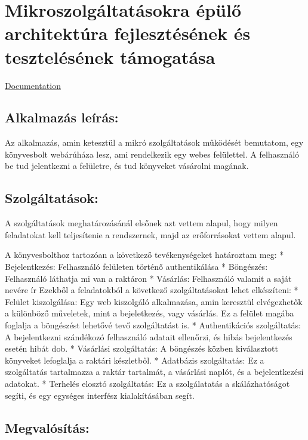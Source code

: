 \documentclass[]{article}
\date{}
\begin{document}
\section{Mikroszolgáltatásokra épülő architektúra fejlesztésének és
tesztelésének
támogatása}\label{mikroszolguxe1ltatuxe1sokra-uxe9puxfclux151-architektuxfara-fejlesztuxe9suxe9nek-uxe9s-teszteluxe9suxe9nek-tuxe1mogatuxe1sa}

\href{https://github.com/borlayda/dipterv2016-microservice/wiki}{Documentation}

\subsection{Alkalmazás leírás:}\label{alkalmazuxe1s-leuxedruxe1s}

Az alkalmazás, amin ketesztül a mikró szolgáltatások működését
bemutatom, egy könyvesbolt webárúháza lesz, ami rendelkezik egy webes
felülettel. A felhasználó be tud jelentkezni a felületre, és tud
könyveket vásárolni magának.

\subsection{Szolgáltatások:}\label{szolguxe1ltatuxe1sok}

A szolgáltatások meghatározásánál elsőnek azt vettem alapul, hogy milyen
feladatokat kell teljesítenie a rendszernek, majd az erőforrásokat
vettem alapul.

A könyvesbolthoz tartozóan a következő tevékenységeket határoztam meg: *
Bejelentkezés: Felhasználó felületen történő authentikálása * Böngészés:
Felhasználó láthatja mi van a raktáron * Vásárlás: Felhasználó valamit a
saját nevére ír Ezekből a feladatokból a következő szolgáltatásokat
lehet elkészíteni: * Felület kiszolgálása: Egy web kiszolgáló
alkalmazása, amin keresztül elvégezhetők a különböző műveletek, mint a
bejeletkezés, vagy vásárlás. Ez a felület magába foglalja a böngészést
lehetővé tevő szolgáltatást is. * Authentikációs szolgáltatás: A
bejelentkezni szándékozó felhasználó adatait ellenőrzi, és hibás
bejelentkezés esetén hibát dob. * Vásárlási szolgáltatás: A böngészés
közben kiválasztott könyveket lefoglalja a raktári készletből. *
Adatbázis szolgáltatás: Ez a szolgáltatás tartalmazza a raktár
tartalmát, a vásárlási naplót, és a bejelentkezési adatokat. * Terhelés
elosztó szolgáltatás: Ez a szolgálatatás a skálázhatóságot segíti, és
egy egységes interfész kialakításában segít.

\subsection{Megvalósítás:}\label{megvaluxf3suxedtuxe1s}
\end{document}
